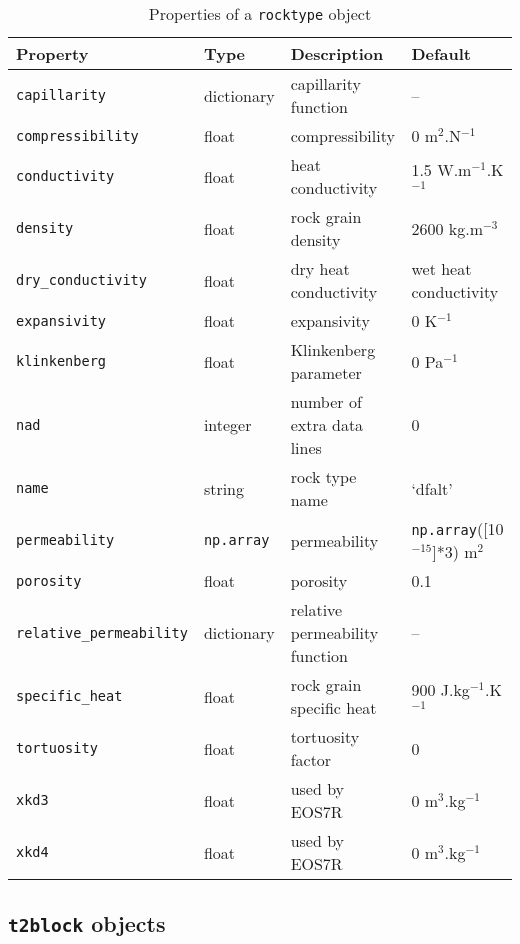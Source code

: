 \begin{table}
  \begin{center}
    \begin{tabular}{|l|l|p{30mm}|l|}
      \hline
      \textbf{Property} & \textbf{Type} & \textbf{Description} & \textbf{Default}\\
      \hline
      \texttt{capillarity} & dictionary & capillarity function & --\\
      \texttt{compressibility} & float & compressibility & 0 m$^2$.N$^{-1}$\\
      \texttt{conductivity} & float & heat conductivity & 1.5 W.m$^{-1}$.K$^{-1}$\\
      \texttt{density} & float & rock grain density & 2600 kg.m$^{-3}$\\
      \texttt{dry\_conductivity} & float & dry heat conductivity & wet heat conductivity\\
      \texttt{expansivity} & float & expansivity & 0 K$^{-1}$\\
      \texttt{klinkenberg} & float & Klinkenberg parameter & 0 Pa$^{-1}$\\
      \texttt{nad} & integer & number of extra data lines & 0\\
      \texttt{name} & string & rock type name & `dfalt'\\
      \texttt{permeability} & \texttt{np.array} & permeability & \texttt{np.array}([10$^{-15}$]*3) m$^2$\\
      \texttt{porosity} & float & porosity & 0.1\\
      \texttt{relative\_permeability} & dictionary & relative permeability function & --\\
      \texttt{specific\_heat} & float & rock grain specific heat & 900 J.kg$^{-1}$.K$^{-1}$\\
      \texttt{tortuosity} & float & tortuosity factor & 0\\
      \texttt{xkd3} & float & used by EOS7R & 0 m$^{3}$.kg$^{-1}$\\
      \texttt{xkd4} & float & used by EOS7R & 0 m$^{3}$.kg$^{-1}$\\
      \hline
    \end{tabular}
    \caption{Properties of a \texttt{rocktype} object}
    \label{tb:rocktype_properties}
  \end{center}
\end{table}

\subsection{\texttt{t2block} objects}
\label{t2blockobjects}


